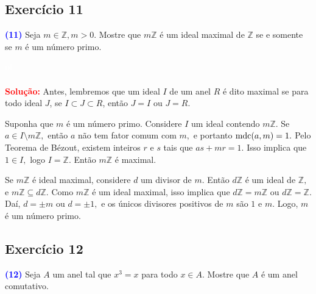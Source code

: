 \documentclass[11pt,a4paper]{article}
\newcommand{\exercicio}[1]{\subsection{Exercício #1} \textcolor{blue}{\bf(#1)}}
\newcommand{\solucao}[1]{
\textbf{\textcolor{white}{oi}\\ \\ \textcolor{red}{Solução:}} #1}
\begin{document}
\exercicio{11}  Seja $m \in \mathbb{Z}, m > 0.$ Mostre que $m\mathbb{Z}$ é um ideal maximal de $\mathbb{Z}$ se e somente se $m$ é um número primo.
\solucao{
Antes, lembremos que um ideal $I$ de um anel $R$ é dito maximal se para todo ideal $J$, se $I \subset J \subset R$, então $J = I$ ou $J = R.$ 

Suponha que $m$ é um número primo. Considere $I$ um ideal contendo $m \mathbb{Z}.$ Se $a \in I \setminus m \mathbb{Z},$ então $a$ não tem fator comum com $m,$ e portanto ${\rm mdc}(a,m) = 1.$ Pelo Teorema de Bézout, existem inteiros $r$ e $s$ tais que $as + mr = 1. $ Isso implica que $1 \in I,$ logo $I = \mathbb{Z}.$ Então $m \mathbb{Z}$ é maximal.

Se $m \mathbb{Z}$ é ideal maximal, considere $d$ um divisor de $m.$ Então $d \mathbb{Z}$ é um ideal de $\mathbb{Z},$ e $m \mathbb{Z} \subseteq d \mathbb{Z}.$ Como $m \mathbb{Z}$ é um ideal maximal, isso implica que $d \mathbb{Z} = m \mathbb{Z}$ ou $d \mathbb{Z} = \mathbb{Z}.$ Daí, $d = \pm m$ ou $d = \pm 1,$ e os únicos divisores positivos de $m$ são $1$ e $m.$ Logo, $m$ é um número primo.
}
\exercicio{12} Seja $A$ um anel tal que $x^3 = x$ para todo $x \in A.$ Mostre que $A$ é um anel comutativo.
\end{document}
